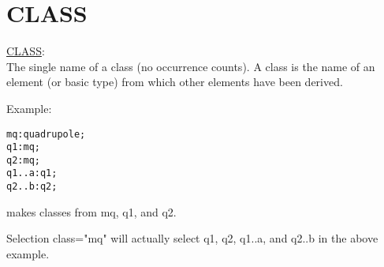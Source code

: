 \section{CLASS}
\href{class}{CLASS}:\\ 
The single name of a class (no occurrence counts). A class is the name
of an element (or basic type) from which other elements have been
derived. 

Example: 
\begin{verbatim}
mq:quadrupole;
q1:mq;
q2:mq;
q1..a:q1;
q2..b:q2;
\end{verbatim} 
makes classes from mq, q1, and q2. 

Selection class="mq" will actually select q1, q2, q1..a, and q2..b in the above example. 


